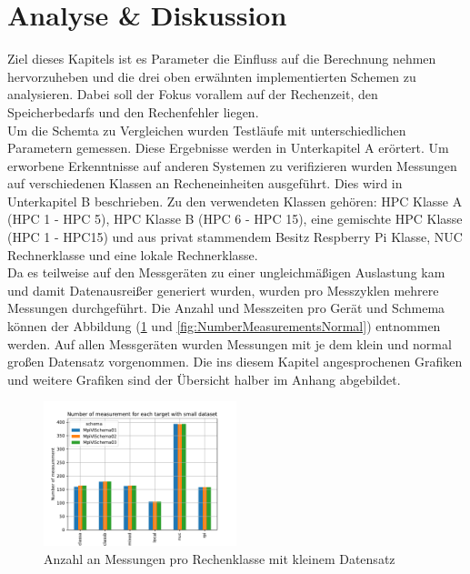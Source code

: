 \section{Analyse \& Diskussion}
\label{sec:analyse_diskussion}
Ziel dieses Kapitels ist es Parameter die Einfluss auf die Berechnung nehmen hervorzuheben und die drei oben erw\"ahnten implementierten Schemen zu analysieren. Dabei soll der Fokus vorallem auf der Rechenzeit, den Speicherbedarfs und den Rechenfehler liegen. \\ Um die  Schemta zu Vergleichen wurden Testl\"aufe mit unterschiedlichen Parametern gemessen. Diese Ergebnisse werden in Unterkapitel A er\"ortert. Um erworbene Erkenntnisse auf anderen Systemen zu verifizieren wurden Messungen auf verschiedenen Klassen an Recheneinheiten ausgef\"uhrt. Dies wird in Unterkapitel B beschrieben. Zu den verwendeten Klassen geh\"oren: HPC Klasse A (HPC 1 - HPC 5), HPC Klasse B (HPC 6 - HPC 15), eine gemischte HPC Klasse (HPC 1 - HPC15) und aus privat stammendem Besitz  Respberry Pi Klasse, NUC Rechnerklasse und eine lokale Rechnerklasse. \\ Da es teilweise auf den Messger\"aten zu einer ungleichm\"a\ss{}igen Auslastung kam und damit Datenausrei\ss{}er generiert wurden, wurden pro Messzyklen mehrere Messungen durchgef\"uhrt. Die Anzahl und Messzeiten pro Ger\"at und Schmema k\"onnen der Abbildung (\ref{fig:NumberMeasurementsSmall} und \ref{fig:NumberMeasurementsNormal}) entnommen werden. Auf allen Messger\"aten wurden Messungen mit je dem klein und normal gro\ss{}en Datensatz vorgenommen. Die ins diesem Kapitel angesprochenen Grafiken und weitere Grafiken sind der \"Ubersicht halber im Anhang abgebildet.

\begin{figure}[h]
	\includegraphics[width=0.5\textwidth]{./gen/img/ds/small/number_measurement_target.pdf}
	\caption{Anzahl an Messungen pro Rechenklasse mit kleinem Datensatz}
	\label{fig:NumberMeasurementsSmall}
\end{figure}

